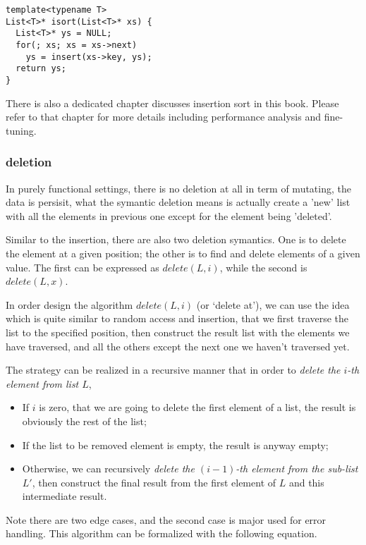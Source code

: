 \documentclass{article}
\begin{document}
\lstset{language=C++}
\begin{lstlisting}
template<typename T>
List<T>* isort(List<T>* xs) {
  List<T>* ys = NULL;
  for(; xs; xs = xs->next)
    ys = insert(xs->key, ys);
  return ys;
}
\end{lstlisting}

There is also a dedicated chapter discusses insertion sort in this book. Please refer to that chapter for
more details including performance analysis and fine-tuning.

\subsubsection{deletion}
In purely functional settings, there is no deletion at all in term of mutating, the data is persisit, what
the symantic deletion means is actually create a 'new' list with all the elements in previous one except for
the element being 'deleted'. 

Similar to the insertion, there are also two deletion symantics. One is to delete the element at a given position;
the other is to find and delete elements of a given value. The first can be expressed as $delete(L, i)$, while
the second is $delete(L, x)$.

In order design the algorithm $delete(L,i)$ (or `delete at'), we can use the idea which is quite similar to 
random access and insertion, that we first traverse the list to the specified position, then construct the 
result list with the elements we have traversed, and all the others except the next one we haven't traversed yet.

The strategy can be realized in a recursive manner that in order to {\em delete the $i$-th element from list $L$},
\begin{itemize}
\item If $i$ is zero, that we are going to delete the first element of a list, the result is obviously the rest of the list;
\item If the list to be removed element is empty, the result is anyway empty;
\item Otherwise, we can recursively {\em delete the $(i-1)$-th element from the sub-list $L'$}, then construct the final
result from the first element of $L$ and this intermediate result.
\end{itemize}

Note there are two edge cases, and the second case is major used for error handling. This algorithm can be formalized
with the following equation.
\end{document}
